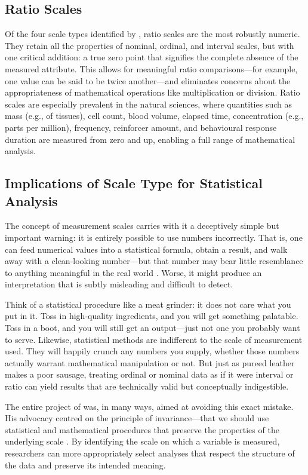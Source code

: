 \subsection{Ratio Scales}
\label{sec:ratio}

Of the four scale types identified by \textcite{Stevens1946}, ratio scales are the most robustly numeric. They retain all the properties of nominal, ordinal, and interval scales, but with one critical addition: a true zero point that signifies the complete absence of the measured attribute. This allows for meaningful ratio comparisons—for example, one value can be said to be twice another—and eliminates concerns about the appropriateness of mathematical operations like multiplication or division. Ratio scales are especially prevalent in the natural sciences, where quantities such as mass (e.g., of tissues), cell count, blood volume, elapsed time, concentration (e.g., parts per million), frequency, reinforcer amount, and behavioural response duration are measured from zero and up, enabling a full range of mathematical analysis.


\subsection{Implications of Scale Type for Statistical Analysis}

The concept of measurement scales carries with it a deceptively simple but important warning: it is entirely possible to use numbers incorrectly. That is, one can feed numerical values into a statistical formula, obtain a result, and walk away with a clean-looking number—but that number may bear little resemblance to anything meaningful in the real world \parencite{Roberts1985}. Worse, it might produce an interpretation that is subtly misleading and difficult to detect.

Think of a statistical procedure like a meat grinder: it does not care what you put in it. Toss in high-quality ingredients, and you will get something palatable. Toss in a boot, and you will still get an output—just not one you probably want to serve. Likewise, statistical methods are indifferent to the scale of measurement used. They will happily crunch any numbers you supply, whether those numbers actually warrant mathematical manipulation or not. But just as pureed leather makes a poor sausage, treating ordinal or nominal data as if it were interval or ratio can yield results that are technically valid but conceptually indigestible.

The entire project of \textcite{Stevens1946} was, in many ways, aimed at avoiding this exact mistake. His advocacy centred on the principle of invariance—that we should use statistical and mathematical procedures that preserve the properties of the underlying scale \parencite{Stevens1968}. By identifying the scale on which a variable is measured, researchers can more appropriately select analyses that respect the structure of the data and preserve its intended meaning.


